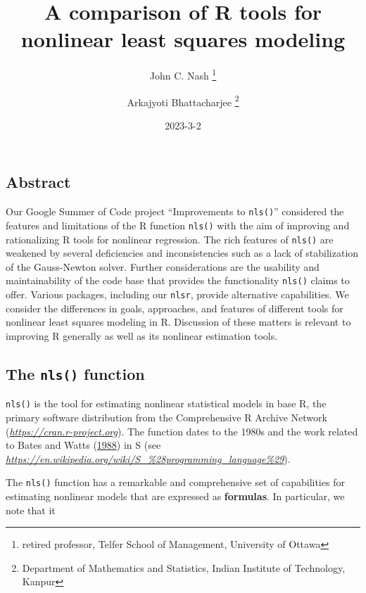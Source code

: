 \documentclass[
]{article}
\title{A comparison of R tools for nonlinear least squares modeling}
\author{John C. Nash
\thanks{ retired professor, Telfer School of Management, University of Ottawa} \and Arkajyoti
Bhattacharjee
\thanks{Department of Mathematics and Statistics, Indian Institute of Technology, Kanpur}}
\date{2023-3-2}
\begin{document}
\maketitle

\hypertarget{abstract}{%
\subsection{Abstract}\label{abstract}}

Our Google Summer of Code project ``Improvements to \texttt{nls()}''
considered the features and limitations of the R function \texttt{nls()}
with the aim of improving and rationalizing R tools for nonlinear
regression. The rich features of \texttt{nls()} are weakened by several
deficiencies and inconsistencies such as a lack of stabilization of the
Gauss-Newton solver. Further considerations are the usability and
maintainability of the code base that provides the functionality
\texttt{nls()} claims to offer. Various packages, including our
\texttt{nlsr}, provide alternative capabilities. We consider the
differences in goals, approaches, and features of different tools for
nonlinear least squares modeling in R. Discussion of these matters is
relevant to improving R generally as well as its nonlinear estimation
tools.

\hypertarget{the-nls-function}{%
\subsection{\texorpdfstring{The \texttt{nls()}
function}{The nls() function}}\label{the-nls-function}}

\texttt{nls()} is the tool for estimating nonlinear statistical models
in base R, the primary software distribution from the Comprehensive R
Archive Network (\emph{\url{https://cran.r-project.org}}). The function
dates to the 1980s and the work related to Bates and Watts
(\protect\hyperlink{ref-bateswatts}{1988}) in S (see
\emph{\url{https://en.wikipedia.org/wiki/S_\%28programming_language\%29}}).

The \texttt{nls()} function has a remarkable and comprehensive set of
capabilities for estimating nonlinear models that are expressed as
\textbf{formulas}. In particular, we note that it
\end{document}
